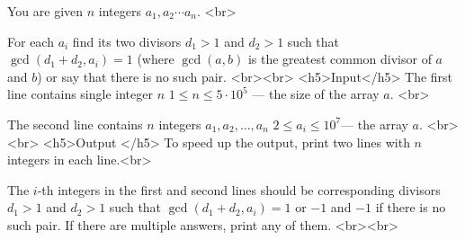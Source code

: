 You are given $n$ integers $a_1,a_2 \cdots a_n$. <br>

For each $a_i$ find its two divisors $d_1>1$ and $d_2>1$ such that $\gcd(d_1 + d_2, a_i) = 1$ (where $\gcd(a,b)$ is the greatest common divisor of $a$ and $b$) or say that there is no such pair.
<br><br>
<h5>Input</h5>
The first line contains single integer $n$ $1 \le n \le 5 \cdot 10^5$ — the size of the array $a$. <br>

The second line contains $n$ integers $a_1, a_2, \dots, a_n$ $2 \le a_i \le 10^7$— the array $a$. <br>
<br>
<h5>Output </h5>
To speed up the output, print two lines with $n$ integers in each line.<br>

The $i$-th integers in the first and second lines should be corresponding divisors $d_1>1$ and $d_2>1$ such that $\gcd(d_1+d_2,a_i)=1$ or $−1$ and $−1$ if there is no such pair. If there are multiple answers, print any of them. <br><br>